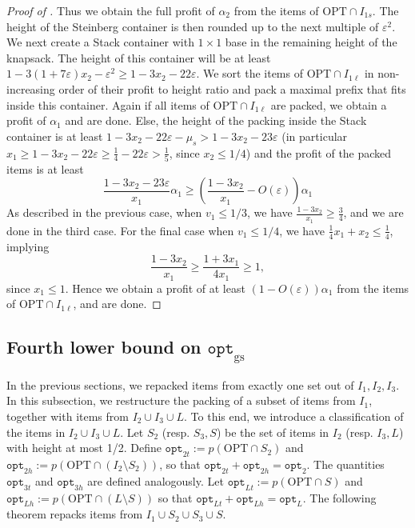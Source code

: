 \documentclass[10pt,a4paper]{amsart}
\renewcommand{\epsilon}{\varepsilon} %
\theoremstyle{definition}
\newcommand{\opt}{\mathtt{opt}}
\newcommand{\optgs}{\mathtt{opt}_{\mathrm{gs}}}
\newcommand{\opttwot}{\mathtt{opt}_{2t}}
\newcommand{\opttwoh}{\mathtt{opt}_{2h}}
\newcommand{\optthreet}{\mathtt{opt}_{3t}}
\newcommand{\optthreeh}{\mathtt{opt}_{3h}}
\newcommand{\optlt}{\mathtt{opt}_{Lt}}
\newcommand{\optlh}{\mathtt{opt}_{Lh}}
\begin{document}
\begin{proof}[Proof of ]
    Thus we obtain the full profit of $\alpha_2$ from the items of $\text{OPT}\cap I_{1s}$. The height of the Steinberg container is then rounded up to the next multiple of $\epsilon^2$. We next create a Stack container with $1\times 1$ base in the remaining height of the knapsack. The height of this container will be at least $1-3(1+7\epsilon)x_2-\epsilon^2 \ge 1-3x_2-22\epsilon$. We sort the items of $\text{OPT}\cap I_{1\ell}$ in non-increasing order of their profit to height ratio and pack a maximal prefix that fits inside this container. Again if all items of $\text{OPT}\cap I_{1\ell}$ are packed, we obtain a profit of $\alpha_1$ and are done. Else, the height of the packing inside the Stack container is at least $1-3x_2-22\epsilon-\mu_s > 1-3x_2-23\epsilon$ (in particular $x_1\ge 1-3x_2-22\epsilon  \ge \frac{1}{4}-22\epsilon>\frac{1}{5}$, since $x_2\le 1/4$) and the profit of the packed items is at least
    \[ \frac{1-3x_2-23\epsilon}{x_1}\alpha_1 \ge \left(\frac{1-3x_2}{x_1}-O(\epsilon)\right)\alpha_1\]
    As described in the previous case, when $v_1\le 1/3$, we have $\frac{1-3x_2}{x_1}\ge \frac{3}{4}$, and we are done in the third case. For the final case when $v_1 \le 1/4$, we have $\frac{1}{4}x_1+x_2 \le \frac{1}{4}$, implying
    \[ \frac{1-3x_2}{x_1} \ge \frac{1+3x_1}{4x_1}\ge 1,\]
    since $x_1 \le 1$. Hence we obtain a profit of at least $(1-O(\epsilon))\alpha_1$ from the items of $\text{OPT}\cap I_{1\ell}$, and are done.    
\end{proof}
\fi


\subsection{Fourth lower bound on \texorpdfstring{$\optgs$}{optgs}}
\label{sec:fourthlb}
In the previous sections, we repacked items from exactly one set out of $I_1, I_2, I_3$. In this subsection, we restructure the packing of a subset of items from $I_1$, together with items from $I_2\cup I_3\cup L$. To this end, we introduce a classification of the items in $I_2\cup I_3\cup L$. 
Let $S_2$ (resp. $S_3,S$) be the set of items in $I_2$ (resp. $I_3,L$) with height at most 1/2. Define $\opttwot := p(\text{OPT}\cap S_2)$ and $\opttwoh := p(\text{OPT}\cap (I_2\setminus S_2))$, so that $\opttwot+\opttwoh = \opt_2$. The quantities $\optthreet$ and $\optthreeh$ are defined analogously. Let $\optlt := p(\text{OPT}\cap S)$ and $\optlh := p(\text{OPT}\cap (L\setminus S))$ so that $\optlt+\optlh = \opt_L$. The following theorem repacks items from $I_1\cup S_2\cup S_3\cup S$.
\end{document}
